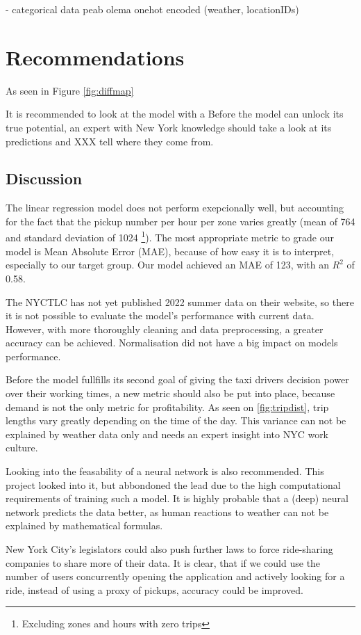 \documentclass[11pt]{article}
\begin{document}
- categorical data peab olema onehot encoded (weather, locationIDs)
\fi


\section{Recommendations}
As seen in Figure \autoref{fig:diffmap}

It is recommended to look at the model with a 
Before the model can unlock its true potential, an expert with New York knowledge should take a look at its predictions and XXX tell where they come from. 


\subsection{Discussion} \label{discussion}

The linear regression model does not perform exepcionally well, but accounting for the fact that the pickup number per hour per zone varies greatly (mean of 764 and standard deviation of 1024 \footnote{Excluding zones and hours with zero trips}). The most appropriate metric to grade our model is Mean Absolute Error (MAE), because of how easy it is to interpret, especially to our target group. Our model achieved an MAE of 123, with an $R^2$ of 0.58.

The NYCTLC has not yet published 2022 summer data on their website, so there it is not possible to evaluate the model's performance with current data. However, with more thoroughly cleaning and data preprocessing, a greater accuracy can be achieved. Normalisation did not have a big impact on models performance.

Before the model fullfills its second goal of giving the taxi drivers decision power over their working times, a new metric should also be put into place, because demand is not the only metric for profitability. As seen on \autoref{fig:tripdist}, trip lengths vary greatly depending on the time of the day. This variance can not be explained by weather data only and needs an expert insight into NYC work culture.

Looking into the feasability of a neural network is also recommended. This project looked into it, but abbondoned the lead due to the high computational requirements of training such a model. It is highly probable that a (deep) neural network predicts the data better, as human reactions to weather can not be explained by mathematical formulas.

New York City's legislators could also push further laws to force ride-sharing companies to share more of their data. It is clear, that if we could use the number of users concurrently opening the application and actively looking for a ride, instead of using a proxy of pickups, accuracy could be improved.
\end{document}
